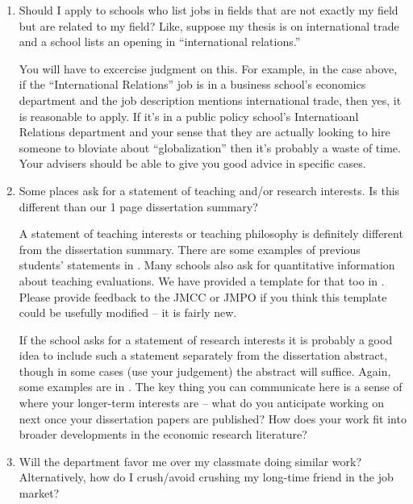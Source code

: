 \documentclass{econtex}
\begin{document}
\begin{enumerate}
\item Should I apply to schools who list jobs in fields that are not exactly my field but are related to my
field?  Like, suppose my thesis is on international trade and a school lists
an opening in ``international relations.''

You will have to excercise judgment on this.  For example, in the case
above, if the ``International Relations'' job is in a business
school's economics department and the job description mentions
international trade, then yes, it is reasonable to apply.  If it's in
a public policy school's Internatioanl Relations department and your
sense that they are actually looking to hire someone to bloviate about
``globalization'' then it's probably a waste of time.  Your advisers
should be able to give you good advice in specific cases.

\item Some places ask for a statement of teaching and/or research
  interests.  Is this different than our 1 page
  dissertation summary?

  A statement of teaching interests or teaching philosophy is
  definitely different from the dissertation summary.  There are some
  examples of previous students' statements in \Resources.  Many
  schools also ask for quantitative information about teaching
  evaluations.  We have provided a template for that too in
  \Templates.  Please provide feedback to the JMCC or JMPO if you
  think this template could be usefully modified -- it is fairly new.

If the school asks for a statement of research interests it is probably
a good idea to include such a statement separately from the dissertation
abstract, though in some cases (use your judgement) the abstract will suffice.  Again, some examples are in \Resources.  
The key thing you can communicate here is a sense of where your longer-term 
interests are -- what do you anticipate working on next once your dissertation
papers are published?  How does your work fit into broader developments in 
the economic research literature?

\item Will the department favor me over my classmate doing similar work?  Alternatively, how do I crush/avoid crushing my long-time friend in the job market?


\end{enumerate}
\end{document}

